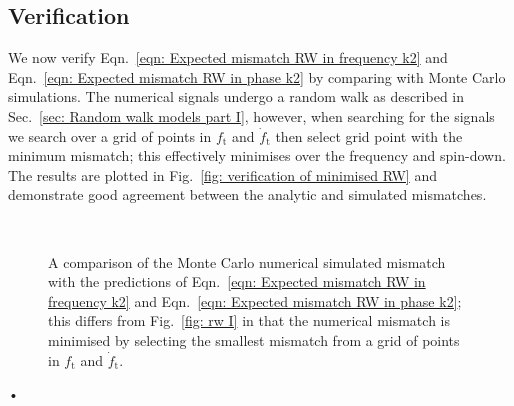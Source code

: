 \subsection{Verification}

We now verify Eqn.~\eqref{eqn: Expected mismatch RW in frequency k2} and
Eqn.~\eqref{eqn: Expected mismatch RW in phase k2} by comparing with Monte
Carlo simulations. The numerical signals undergo a random walk as described in
Sec.~\ref{sec: Random walk models part I}, however, when searching for the
signals we search over a grid of points in $f_\textrm{t}$ and $\dot{f}_\textrm{t}$ then select grid point
with the minimum mismatch; this effectively minimises over the frequency and
spin-down. The results are plotted in Fig.~\ref{fig: verification of
minimised RW} and demonstrate good agreement between the analytic and simulated
mismatches.

\begin{figure}[ht]
\centering
{}
\\
\caption{A comparison of the Monte Carlo numerical simulated mismatch with the
predictions of Eqn.~\eqref{eqn: Expected mismatch RW in
frequency k2} and Eqn.~\eqref{eqn: Expected mismatch RW in phase k2}; this differs
from Fig.~\ref{fig: rw I} in that the numerical mismatch is minimised by selecting
the smallest mismatch from a grid of points in $f_\textrm{t}$ and $\dot{f}_\textrm{t}$.}
\label{fig: verification of minimised RW}
\end{figure}•
\FloatBarrier
